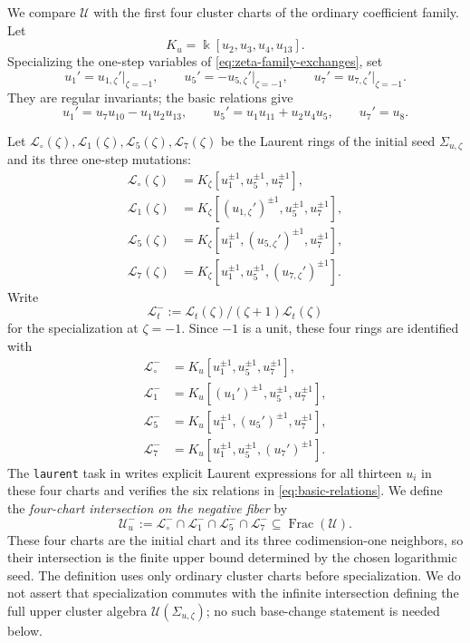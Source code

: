 \documentclass[11pt,reqno]{amsart}
\numberwithin{equation}{section}
\theoremstyle{remark}
\newcommand{\kk}{\Bbbk}
\newcommand{\cL}{\mathcal{L}}
\newcommand{\cU}{\mathcal{U}}
\newcommand{\UR}{\mathscr U}
\newcommand{\Uneg}{\mathcal U_u^{-}}
\newcommand{\Frac}{\operatorname{Frac}}
\begin{document}
We compare $\UR$ with the first four cluster charts of the ordinary
coefficient family.  Let
\[ K_u=\kk[u_2,u_3,u_4,u_{13}]. \]
Specializing the one-step variables of \eqref{eq:zeta-family-exchanges}, set
\[ u_1'=u_{1,\zeta}'\big|_{\zeta=-1},\qquad u_5'=-u_{5,\zeta}'\big|_{\zeta=-1},\qquad u_7'=u_{7,\zeta}'\big|_{\zeta=-1}. \]
They are regular invariants; the basic relations give
\begin{equation}
\label{eq:partners-in-u}
 u_1'=u_7u_{10}-u_1u_2u_{13},
 \qquad
 u_5'=u_1u_{11}+u_2u_4u_5,
 \qquad
 u_7'=u_8.
\end{equation}

Let $\cL_\circ(\zeta),\cL_1(\zeta),\cL_5(\zeta),\cL_7(\zeta)$
be the Laurent rings of the initial seed $\Sigma_{u,\zeta}$ and its
three one-step mutations:
\begin{equation*}
 \begin{aligned}
 \cL_\circ(\zeta)&=K_\zeta[u_1^{\pm1},u_5^{\pm1},u_7^{\pm1}],\\
 \cL_1(\zeta)&=K_\zeta[(u_{1,\zeta}')^{\pm1},u_5^{\pm1},u_7^{\pm1}],\\
 \cL_5(\zeta)&=K_\zeta[u_1^{\pm1},(u_{5,\zeta}')^{\pm1},u_7^{\pm1}],\\
 \cL_7(\zeta)&=K_\zeta[u_1^{\pm1},u_5^{\pm1},(u_{7,\zeta}')^{\pm1}].
 \end{aligned}
\end{equation*}
Write
\[ \cL_t^-:=\cL_t(\zeta)/(\zeta+1)\cL_t(\zeta) \]
for the specialization at $\zeta=-1$.  Since $-1$ is a unit,
these four rings are identified with
\begin{equation*}
 \begin{aligned}
 \cL_\circ^-&=K_u[u_1^{\pm1},u_5^{\pm1},u_7^{\pm1}],\\
 \cL_1^-&=K_u[(u_1')^{\pm1},u_5^{\pm1},u_7^{\pm1}],\\
 \cL_5^-&=K_u[u_1^{\pm1},(u_5')^{\pm1},u_7^{\pm1}],\\
 \cL_7^-&=K_u[u_1^{\pm1},u_5^{\pm1},(u_7')^{\pm1}].
 \end{aligned}
\end{equation*}
The \texttt{laurent} task in  writes
explicit Laurent expressions for all thirteen $u_i$ in these four charts
and verifies the six relations in \eqref{eq:basic-relations}.
We define the \emph{four-chart intersection on the negative fiber} by
\[ \Uneg:=\cL_\circ^-\cap\cL_1^-\cap\cL_5^-\cap\cL_7^- \subseteq\Frac(\UR). \]
These four charts are the initial chart and its three codimension-one
neighbors, so their intersection is the finite upper bound determined by the chosen
logarithmic seed.  The definition uses only ordinary cluster
charts before specialization.  We do not assert that specialization commutes
with the infinite intersection defining the full upper cluster algebra
$\cU(\Sigma_{u,\zeta})$; no such base-change statement is needed below.
\end{document}
